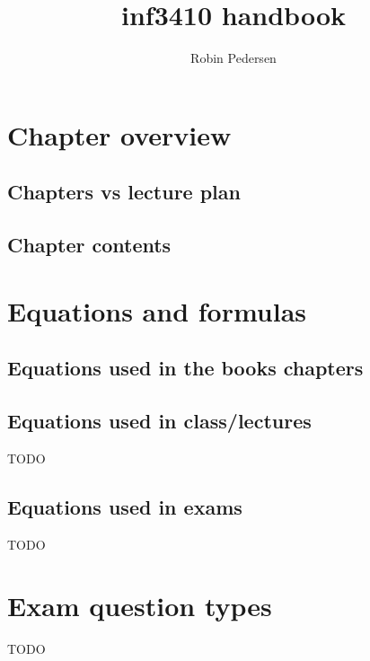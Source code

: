 \documentclass[twocolumn]{article}
\begin{document}
  \title{inf3410 handbook}
  \author{Robin Pedersen}
  \maketitle
  \tableofcontents

  
  \section{Chapter overview}
    
    \subsection{Chapters vs lecture plan}
      
    \subsection{Chapter contents}
      
  \section{Equations and formulas}
    \subsection{Equations used in the books chapters}
      
    \subsection{Equations used in class/lectures}
      TODO
    \subsection{Equations used in exams}
      TODO
  \section{Exam question types}
    TODO
  \printindex
\end{document}
